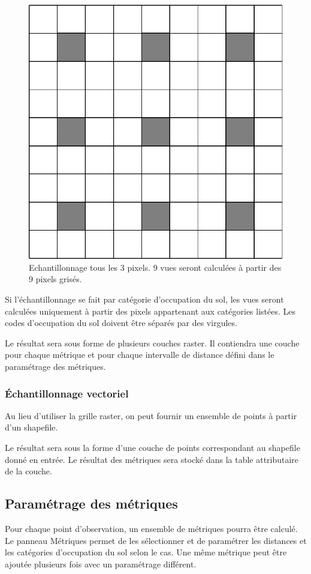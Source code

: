 \documentclass{report}
\begin{document}
\begin{figure}[H]
	\includegraphics[scale=0.5]{img/grid_sampling.pdf} 
	\caption{Echantillonnage tous les 3 pixels. 9 vues seront calculées à partir des 9 pixels grisés.}
	\label{grid_sampling}
\end{figure}

Si l'échantillonnage se fait par catégorie d'occupation du sol, les vues seront calculées uniquement à partir des pixels appartenant aux catégories listées. Les codes d'occupation du sol doivent être séparés par des virgules.

Le résultat sera sous forme de plusieurs couches raster. Il contiendra une couche pour chaque métrique et pour chaque intervalle de distance défini dans le paramétrage des métriques.

\subsubsection{Échantillonnage vectoriel}
Au lieu d'utiliser la grille raster, on peut fournir un ensemble de points à partir d'un shapefile.

Le résultat sera sous la forme d'une couche de points correspondant au shapefile donné en entrée. Le résultat des métriques sera stocké dans la table attributaire de la couche.


\subsection{Paramétrage des métriques}
\label{param_metrics}
Pour chaque point d'observation, un ensemble de métriques pourra être calculé. Le panneau Métriques permet de les sélectionner et de paramétrer les distances et les catégories d'occupation du sol selon le cas. Une même métrique peut être ajoutée plusieurs fois avec un paramétrage différent.
\end{document}
